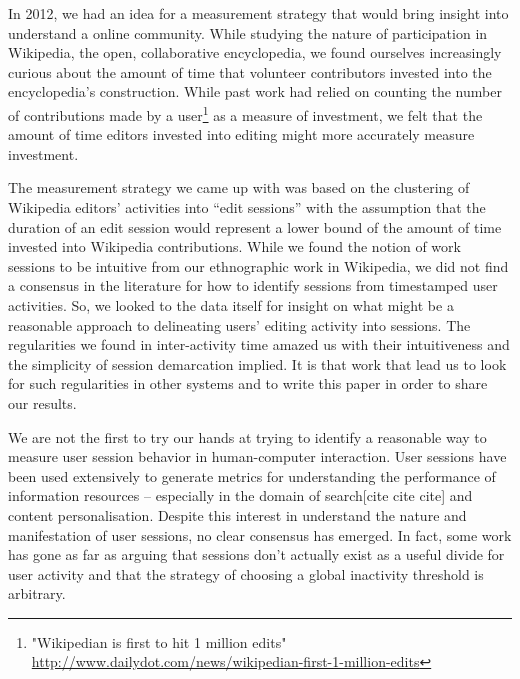 In 2012, we had an idea for a measurement strategy that would bring insight into understand a online community.  While studying the nature of participation in Wikipedia, the open, collaborative encyclopedia, we found ourselves increasingly curious about the amount of time that volunteer contributors invested into the encyclopedia's construction.  While past work had relied on counting the number of contributions made by a user\footnote{"Wikipedian is first to hit 1 million edits" \url{http://www.dailydot.com/news/wikipedian-first-1-million-edits}} as a measure of investment, we felt that the amount of time editors invested into editing might more accurately measure investment.

The measurement strategy we came up with was based on the clustering of Wikipedia editors' activities into ``edit sessions'' with the assumption that the duration of an edit session would represent a lower bound of the amount of time invested into Wikipedia contributions\cite{geiger2013using}.  While we found the notion of work sessions to be intuitive from our ethnographic work in Wikipedia, we did not find a consensus in the literature for how to identify sessions from timestamped user activities.  So, we looked to the data itself for insight on what might be a reasonable approach to delineating users' editing activity into sessions. The regularities we found in inter-activity time amazed us with their intuitiveness and the simplicity of session demarcation implied. It is that work that lead us to look for such regularities in other systems and to write this paper in order to share our results.

We are not the first to try our hands at trying to identify a reasonable way to measure user session behavior in human-computer interaction.  User sessions have been used extensively to generate metrics for understanding the performance of information resources\cite{govseva2006empirical} -- especially in the domain of search[cite cite cite] and content personalisation\cite{spiliopoulou2003framework,gomory1999analysis}. Despite this interest in understand the nature and manifestation of user sessions, no clear consensus has emerged.  In fact, some work has gone as far as arguing that sessions don't actually exist as a useful divide for user activity\cite{jones2008beyond} and that the strategy of choosing a global inactivity threshold is arbitrary\cite{montgomery2001identifying}.

